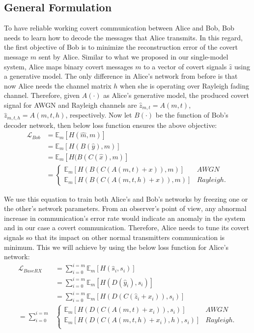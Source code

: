 \subsection{General Formulation}

To have reliable working covert communication between Alice and Bob, Bob needs to learn how to decode the messages that Alice transmits. In this regard, the first objective of Bob is to minimize the reconstruction error of the covert message \(m\) sent by Alice. Similar to what we proposed in our single-model system, Alice maps binary covert messages \(m\) to a vector of covert signals \(\hat{z}\) using a generative model. The only difference in Alice's network from before is that now Alice needs the channel matrix \(h\) when she is operating over Rayleigh fading channel. Therefore, given \(A(\cdot)\) as Alice's generative model, the produced covert signal for AWGN and Rayleigh channels are \(\hat{z}_{m, t} = A(m, t)\), \(\hat{z}_{m, t, h} = A(m, t, h)\), respectively. Now let \(B(\cdot)\) be the function of Bob's decoder network, then below loss function ensures the above objective:
\begin{equation}
	\begin{aligned} \label{multi_bob_loss}
		\mathcal{L}_{Bob} & = \mathbb{E}_{m}[H(\hat{m}, m)] \\
		& = \mathbb{E}_{m}[H(B(\hat{y}), m)] \\ 
		& = \mathbb{E}_{m}[H(B(C(\hat{x}), m)] \\ 
		& = \begin{cases} 
			\mathbb{E}_{m}[H(B(C(A(m, t) + x)), m)] & AWGN \\
			\mathbb{E}_{m}[H(B(C(A(m, t, h) + x)), m)] & Rayleigh.
			\end{cases}
	\end{aligned}
\end{equation}

We use this equation to train both Alice's and Bob's networks by freezing one or the other's network parameters. From an observer's point of view, any abnormal increase in communication's error rate would indicate an anomaly in the system and in our case a covert communication. Therefore, Alice needs to tune its covert signals so that its impact on other normal transmitters communication is minimum. This we will achieve by using the below loss function for Alice's network:
\begin{equation}
	\begin{aligned} \label{multi_alice_user_loss}
		\mathcal{L}_{BaseRX} & = \sum_{i=0}^{i=m}\mathbb{E}_{m}[H(\hat{s}_i, s_i)] \\
		& = \sum_{i=0}^{i=m}\mathbb{E}_{m}[H(D(\hat{y}_i), s_i)] \\
		& = \sum_{i=0}^{i=m}\mathbb{E}_{m}[H(D(C(\hat{z}_i + x_i)), s_i)] \\
		= \sum_{i=0}^{i=m} & \begin{cases} 
			\mathbb{E}_{m}[H(D(C(A(m, t) +  x_i)), s_i)] & AWGN \\
			\mathbb{E}_{m}[H(D(C(A(m, t, h) + x_i), h), s_i)] & Rayleigh. \\
		\end{cases} 
	\end{aligned}
\end{equation}
 
